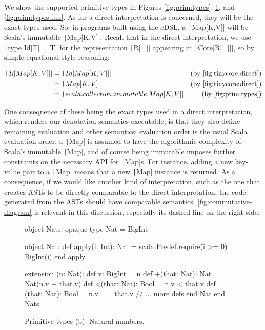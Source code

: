 \documentclass[11pt]{article}
\renewcommand{\vref}[1]{\autoref{#1} \vpageref{#1}}{}
\newcommand{\ScalaI}[1]{\texttt|#1|}
\begin{document}
We show the supported primitive types in Figures \ref{fig:prim:types}, \ref{fig:prim:types:nat}, and \ref{fig:prim:types:fun}.
As far a direct interpretation is concerned, they will be the exact types used. So, in programs built using the eDSL, a \ScalaI{Map[K,V]} will be Scala's immutable \ScalaI{Map[K,V]}. Recall that in the direct interpretation, we use \ScalaI{type Id[T] = T} for the representation \ScalaI{R[_]} appearing in \ScalaI{Core[R[_]]}, so by simple equational-style reasoning:
    
\begin{align*}
  \ScalaI{R[Map[K, V]]} &= \ScalaI{Id[Map[K, V]]} &%
      \text{(by \autoref{fig:tinycore:direct})}   \\
                        &= \ScalaI{Map[K, V]}     &%
      \text{(by \autoref{fig:tinycore:direct})}   \\
                        &= \ScalaI{scala.collection.immutable.Map[K, V]} &%
      \text{(by \autoref{fig:prim:types})}
\end{align*}

One consequence of these being the exact types used in a direct interpretation, which renders our denotation semantics executable, is that they also define remaining evaluation and other semantics: evaluation order is the usual Scala evaluation order, a \ScalaI{Map} is assumed to have the algorithmic complexity of Scala's immutable \ScalaI{Map}, and of course being immutable imposes further constraints on the necessary API for \ScalaI{Map}s. For instance, adding a new key-value pair to a \ScalaI{Map} means that a new \ScalaI{Map} instance is returned. As a consequence, if we would like another kind of interpretation, such as the one that creates ASTs to be directly comparable to the direct interpretation, the code generated from the ASTs should have comparable semantics. \vref{fig:commutative-diagram} is relevant in this discussion, especially its dashed line on the right side.

\begin{figure}[t]
\begin{ScalaBlock}
object Nats:
  opaque type Nat = BigInt

  object Nat:
    def apply(i: Int): Nat =
      scala.Predef.require(i >= 0)
      BigInt(i)
    end apply
    
    extension (n: Nat):
      def v: BigInt = n
      def +(that: Nat): Nat = Nat(n.v + that.v)
      def <(that: Nat): Bool = n.v < that.v
      def ===(that: Nat): Bool = n.v == that.v
      // ... more defs 
  end Nat
end Nats
\end{ScalaBlock}
\caption{Primitive types (b): Natural numbers.}
\label{fig:prim:types:nat}
\hrulefill
\end{figure}
\end{document}
